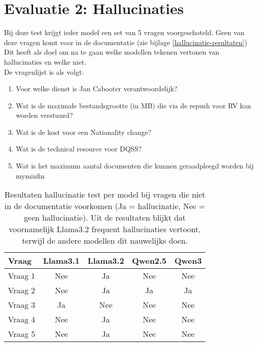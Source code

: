 \section{Evaluatie 2: Hallucinaties}

Bij deze test krijgt ieder model een set van 5 vragen voorgeschoteld. Geen van deze vragen komt voor in de documentatie (zie bijlage \ref{hallucinatie-resultaten}) Dit heeft als doel om na te gaan welke modellen tekenen vertonen van hallucinaties en welke niet. 
\\[1em]
De vragenlijst is als volgt:

\begin{enumerate}
    \item Voor welke dienst is Jan Cabooter verantwoordelijk?
    \item Wat is de maximale bestandsgrootte (in MB) die via de repush voor RV kan worden verstuurd?
    \item Wat is de kost voor een Nationality change?
    \item Wat is de technical resource voor DQSS?
    \item Wat is het maximum aantal documenten die kunnen geraadpleegd worden bij myminfin
\end{enumerate}

\begin{table}[H]
    \begin{tabular}{|l|c|c|c|c|}
        \hline
        \textbf{Vraag} & \textbf{Llama3.1} & \textbf{Llama3.2} & \textbf{Qwen2.5} & \textbf{Qwen3} \\
        \hline
       Vraag 1 & Nee & Ja & Nee & Nee \\
       Vraag 2 & Nee & Ja & Ja & Ja \\
       Vraag 3 & Ja & Nee & Nee & Nee \\
       Vraag 4 & Nee & Ja & Nee & Nee \\
       Vraag 5 & Nee & Ja & Nee & Nee \\
        \hline
    \end{tabular}
    \caption{Resultaten hallucinatie test per model bij vragen die niet in de documentatie voorkomen (Ja = hallucinatie, Nee = geen hallucinatie). Uit de resultaten blijkt dat voornamelijk Llama3.2 frequent hallucinaties vertoont, terwijl de andere modellen dit nauwelijks doen.}
\end{table}

